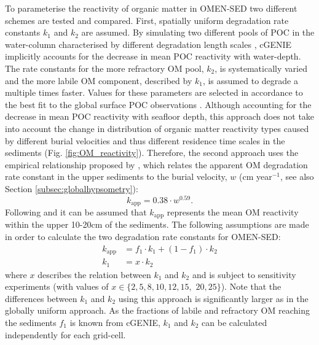 \documentclass[gmd, manuscript]{copernicus}
\begin{document}
To parameterise the reactivity of organic matter in OMEN-SED two different schemes are tested and compared. First, spatially uniform degradation rate constants $k_1$ and $k_2$ are assumed. 
By simulating two different pools of POC in the water-column characterised by different degradation length scales \citep{ridgwell_marine_2007}, cGENIE implicitly accounts for the decrease in mean POC reactivity with water-depth. 
The rate constants for the more refractory OM pool, $k_2$, is systematically varied and the more labile OM component, described by $k_1$, is assumed to degrade a multiple times faster. Values for these parameters are selected 
in accordance to the best fit to the global surface POC observations \citep{seiter_organic_2004}. 
Although accounting for the decrease in mean POC reactivity with seafloor depth, this approach does not take into account the change in distribution of organic matter reactivity types caused by different burial velocities 
and thus different residence time scales in the sediments (Fig. \ref{fig:OM_reactivity}). Therefore, the second approach uses the empirical relationship proposed by \citet{boudreau1997diagenetic}, 
which relates the apparent OM degradation rate constant in the upper sediments to the burial velocity, $w$ (cm year$^{-1}$, see also Section \ref{subsec:globalhypsometry}):
\begin{equation}
 k_\mathrm{app} = 0.38 \cdot w^{0.59}.
\end{equation}
Following \citet{boudreau1997diagenetic} and \citet{stolpovsky_toward_2015} it can be assumed that $k_\mathrm{app}$ represents the mean OM reactivity within the upper 10-20cm of the sediments. 
The following assumptions are made in order to calculate the two degradation rate constants for OMEN-SED:
\begin{align}
  k_\mathrm{app} &= f_1 \cdot k_1 + (1-f_1) \cdot k_2 \label{boudreau_assumption1}\\
  k_1 &= x \cdot k_2					\label{boudreau_assumption2}
\end{align}
where $x$ describes the relation between $k_1$ and $k_2$ and is subject to sensitivity experiments (with values of $x \in \{2, 5, 8, 10, 12, 15,  $ $ 20, 25\}$). 
Note that the differences between  $k_1$ and $k_2$ using this approach is significantly larger as in the globally uniform approach. 
As the fractions of labile and refractory OM reaching the sediments $f_1$ is known from cGENIE, $k_1$ and $k_2$ can be calculated independently for each grid-cell. 
\end{document}
